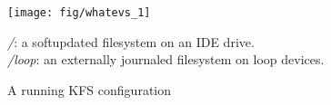 \begin{figure}[htb]
  \centering
  \texttt{[image: fig/whatevs\_1]}
  \caption{A running KFS configuration}{{\it/}: a softupdated
    filesystem on an IDE drive.\\{\it/loop}: an externally journaled
    filesystem on loop devices.}
  \label{fig:kfs-graph}
\end{figure}
\vspace{-10pt}
